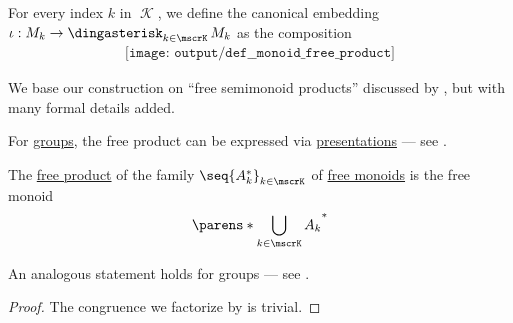 \begin{definition}
  For every index \( k \) in \( \mscrK \), we define the canonical embedding \( \iota: M_k \to \Ast_{k \in \mscrK} M_k \) as the composition
  \begin{equation}\label{eq:def:monoid_free_product/embedding}
    \begin{aligned}
      \texttt{[image: output/def\_\_monoid\_free\_product]}
    \end{aligned}
  \end{equation}
\end{definition}
\begin{comments}
  \item We base our construction on \enquote{free semimonoid products} discussed by , but with many formal details added.

  \item For \hyperref[def:group]{groups}, the free product can be expressed via \hyperref[def:group_presentation]{presentations} --- see .
\end{comments}

\begin{proposition}\label{thm:free_product_of_free_monoids}
  The \hyperref[def:monoid_free_product]{free product} of the family \( \seq{ A_k^* }_{k \in \mscrK} \) of \hyperref[def:free_monoid]{free monoids} is the free monoid
  \begin{equation*}
    \parens*{ \bigcup_{k \in \mscrK} A_k }^*
  \end{equation*}
\end{proposition}
\begin{comments}
  \item An analogous statement holds for groups --- see .
\end{comments}
\begin{proof}
  The congruence we factorize by is trivial.
\end{proof}

